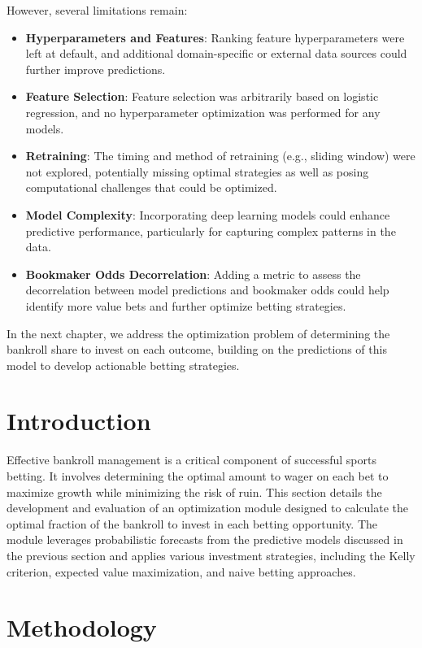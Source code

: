 However, several limitations remain:

\begin{itemize}
    \item \textbf{Hyperparameters and Features}: Ranking feature hyperparameters were left at default, and additional domain-specific or external data sources could further improve predictions.
    \item \textbf{Feature Selection}: Feature selection was arbitrarily based on logistic regression, and no hyperparameter optimization was performed for any models.
    \item \textbf{Retraining}: The timing and method of retraining (e.g., sliding window) were not explored, potentially missing optimal strategies as well as posing computational challenges that could be optimized.
    \item \textbf{Model Complexity}: Incorporating deep learning models could enhance predictive performance, particularly for capturing complex patterns in the data.
    \item \textbf{Bookmaker Odds Decorrelation}: Adding a metric to assess the decorrelation between model predictions and bookmaker odds could help identify more value bets and further optimize betting strategies.
\end{itemize}
In the next chapter, we address the optimization problem of determining the bankroll share to invest on each outcome, building on the predictions of this model to develop actionable betting strategies.

\section{Introduction}

Effective bankroll management is a critical component of successful sports betting. It involves determining the optimal amount to wager on each bet to maximize growth while minimizing the risk of ruin. This section details the development and evaluation of an optimization module designed to calculate the optimal fraction of the bankroll to invest in each betting opportunity. The module leverages probabilistic forecasts from the predictive models discussed in the previous section and applies various investment strategies, including the Kelly criterion, expected value maximization, and naive betting approaches.

\section{Methodology}
